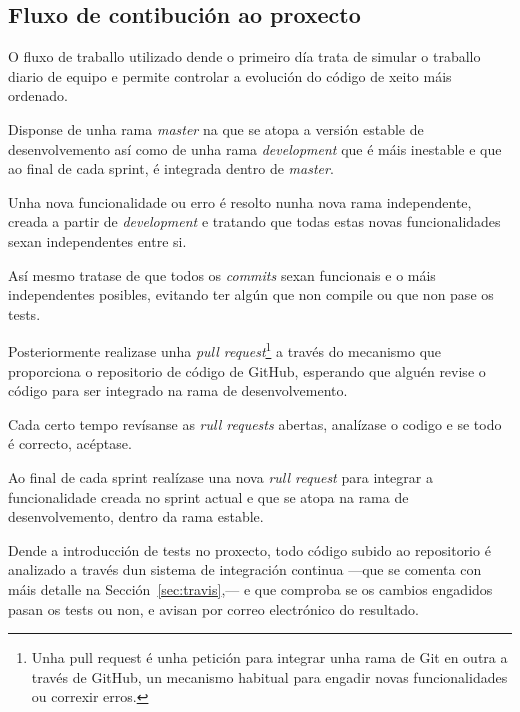     \subsection{Fluxo de contibución ao proxecto}
    O fluxo de traballo utilizado dende o primeiro día trata de simular o 
traballo diario de equipo e permite controlar a evolución do código de xeito 
máis ordenado.

    Disponse de unha rama \emph{master} na que se atopa a versión estable de 
desenvolvemento así como de unha rama \emph{development} que é máis inestable e 
que ao final de cada sprint, é integrada dentro de \emph{master}.

    Unha nova funcionalidade ou erro é resolto nunha nova rama independente,
creada a partir de \emph{development} e tratando que todas estas novas 
funcionalidades sexan independentes entre si.

    Así mesmo tratase de que todos os \emph{commits} sexan funcionais e o máis 
independentes posibles, evitando ter algún que non compile ou que non pase 
os tests.

    Posteriormente realizase unha \emph{pull request}\footnote{Unha pull 
request é unha petición para integrar unha rama de Git en outra a través de 
GitHub, un mecanismo habitual para engadir novas funcionalidades ou correxir 
erros.} a través do mecanismo que proporciona o repositorio 
de código de GitHub, esperando que alguén revise o código para ser 
integrado na rama de desenvolvemento.

    Cada certo tempo revísanse as \emph{rull requests} abertas, analízase o 
codigo e se todo é correcto, acéptase.

    Ao final de cada sprint realízase una nova \emph{rull request} para 
integrar a funcionalidade creada no sprint actual e que se atopa na rama de 
desenvolvemento, dentro da rama estable.

    Dende a introducción de tests no proxecto, todo código subido ao 
repositorio é analizado a través dun sistema de integración continua
---que se comenta con máis detalle na Sección~\ref{sec:travis},--- e que comproba se os cambios 
engadidos pasan os tests ou non, e avisan por correo 
electrónico do resultado.


